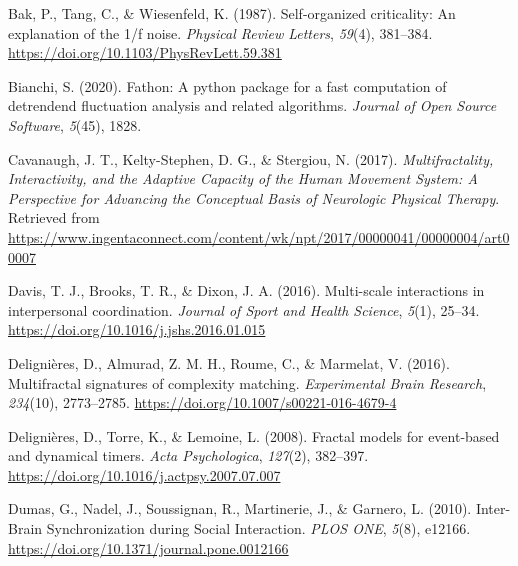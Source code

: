 \documentclass[
  man]{apa6}
\newlength{\cslhangindent}
\newlength{\cslentryspacingunit} %
\newenvironment{CSLReferences}[2] %
 {%
  \setlength{\parindent}{0pt}
  \ifodd #1
  \let\oldpar\par
  \def\par{\hangindent=\cslhangindent\oldpar}
  \fi
  \setlength{\parskip}{#2\cslentryspacingunit}
 }%
 {}
\begin{document}
\begingroup
\setlength{\parindent}{-0.5in}
\setlength{\leftskip}{0.5in}

\hypertarget{refs}{}
\begin{CSLReferences}{1}{0}
\leavevmode{}%
Bak, P., Tang, C., \& Wiesenfeld, K. (1987). Self-organized criticality: {An} explanation of the 1/f noise. \emph{Physical Review Letters}, \emph{59}(4), 381--384. \url{https://doi.org/10.1103/PhysRevLett.59.381}

\leavevmode{}%
Bianchi, S. (2020). Fathon: A python package for a fast computation of detrendend fluctuation analysis and related algorithms. \emph{Journal of Open Source Software}, \emph{5}(45), 1828.

\leavevmode{}%
Cavanaugh, J. T., Kelty-Stephen, D. G., \& Stergiou, N. (2017). \emph{Multifractality, Interactivity, and the Adaptive Capacity of the Human Movement System: A Perspective for Advancing the Conceptual Basis of Neurologic Physical Therapy}. Retrieved from \url{https://www.ingentaconnect.com/content/wk/npt/2017/00000041/00000004/art00007}

\leavevmode{}%
Davis, T. J., Brooks, T. R., \& Dixon, J. A. (2016). Multi-scale interactions in interpersonal coordination. \emph{Journal of Sport and Health Science}, \emph{5}(1), 25--34. \url{https://doi.org/10.1016/j.jshs.2016.01.015}

\leavevmode{}%
Delignières, D., Almurad, Z. M. H., Roume, C., \& Marmelat, V. (2016). Multifractal signatures of complexity matching. \emph{Experimental Brain Research}, \emph{234}(10), 2773--2785. \url{https://doi.org/10.1007/s00221-016-4679-4}

\leavevmode{}%
Delignières, D., Torre, K., \& Lemoine, L. (2008). Fractal models for event-based and dynamical timers. \emph{Acta Psychologica}, \emph{127}(2), 382--397. \url{https://doi.org/10.1016/j.actpsy.2007.07.007}

\leavevmode{}%
Dumas, G., Nadel, J., Soussignan, R., Martinerie, J., \& Garnero, L. (2010). Inter-{Brain} {Synchronization} during {Social} {Interaction}. \emph{PLOS ONE}, \emph{5}(8), e12166. \url{https://doi.org/10.1371/journal.pone.0012166}


\end{CSLReferences}
\end{document}
